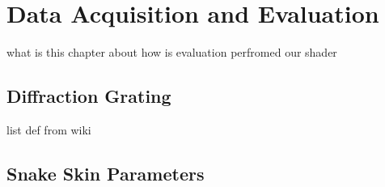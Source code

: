 \section{Data Acquisition and Evaluation}
what is this chapter about
how is evaluation perfromed
our shader
\subsection{Diffraction Grating}
list def from wiki

\subsection{Snake Skin Parameters}
